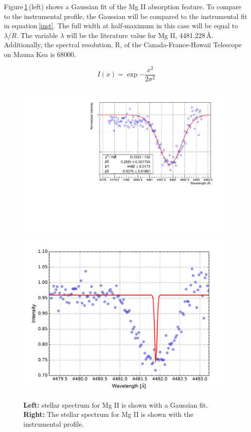 \documentclass[onecolumn]{aastex6}
\begin{document}
\clearpage
Figure\,\ref{mggaus}\,(left) shows a Gaussian fit of the Mg II absorption feature. To compare to the instrumental profile, the Gaussian will be compared to the instrumental fit in equation\,\ref{inst}. The full width at half-maximum in this case will be equal to $\lambda / R$. The variable $\lambda$ will be the literature value for Mg II, 4481.228\,\AA. Additionally, the spectral resolution, R, of the Canada-France-Hawaii Telescope on Mauna Kea is 68000. 

\begin{equation}
I(x) = \exp{-\frac{x^2}{2\sigma^2}}
\label{inst}
\end{equation}


\begin{figure}[ht]
  \centering
  \includegraphics[scale=0.4]{mggaus.pdf}%
  \includegraphics[scale=0.4]{Mg_absorp.pdf}%
  \caption{\textbf{Left: } stellar spectrum for Mg II is shown with a Gaussian fit. \textbf{Right: } The stellar spectrum for Mg II is shown with the instrumental profile.}
  \label{mggaus}
\end{figure}
\end{document}
